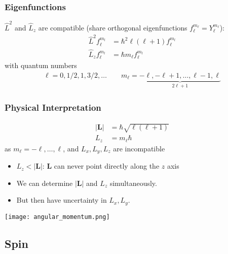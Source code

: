 \subsubsection{Eigenfunctions}

$\widehat{L}^2$ and $\widehat{L}_z$ are compatible (share orthogonal eigenfunctions $f_{\ell}^{m_\ell}=Y_{\ell}^{m_\ell}$):
\begin{align*}
    \widehat{L}^2 f_{\ell}^{m_l} & =\hbar^{2}\ell (\ell+1) f_{\ell}^{m_l} \\
    \widehat{L}_z f_{\ell}^{m_l} & =\hbar m_\ell f_{\ell}^{m_l}
\end{align*}
with quantum numbers
\begin{align*}
    \ell  =0, 1/2, 1, 3/2,\ldots\qquad  m_\ell = \underbrace{-\ell, -\ell+1, \ldots, \ell-1, \ell}_{2\ell+1}
\end{align*}

\subsubsection{Physical Interpretation}
\noindent\begin{align*}
    |\mathbf{L}| & =\hbar\sqrt{\ell(\ell+1)} \\
    L_{z}        & =m_{\ell}\hbar
\end{align*}
as $m_{\ell}=-\ell,\dots,\ell$, and $L_x, L_y, L_z$ are incompatible
\begin{itemize}
    \item $L_z < |\mathbf{L}|$: $\mathbf{L}$ can never point directly along the $z$ axis
    \item We can determine $|\mathbf{L}|$ and $L_{z}$ simultaneously.
    \item But then have uncertainty in $L_x, L_y$.
\end{itemize}
\begin{center}
    \texttt{[image: angular\_momentum.png]}
\end{center}

\subsection{Spin}
